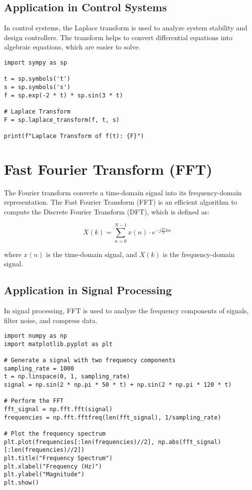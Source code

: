\documentclass{article}
\begin{document}
\subsection{Application in Control Systems}
In control systems, the Laplace transform is used to analyze system stability and design controllers. The transform helps to convert differential equations into algebraic equations, which are easier to solve.

\begin{lstlisting}[caption={laplace_transform.py -- Computing the Laplace Transform}, label=code:laplace_transform]
import sympy as sp

t = sp.symbols('t')
s = sp.symbols('s')
f = sp.exp(-2 * t) * sp.sin(3 * t)

# Laplace Transform
F = sp.laplace_transform(f, t, s)

print(f"Laplace Transform of f(t): {F}")
\end{lstlisting}

\section{Fast Fourier Transform (FFT)}
The Fourier transform converts a time-domain signal into its frequency-domain representation. The Fast Fourier Transform (FFT) is an efficient algorithm to compute the Discrete Fourier Transform (DFT), which is defined as:

\[
X(k) = \sum_{n=0}^{N-1} x(n) \cdot e^{-j \frac{2\pi}{N} kn}
\]

where \( x(n) \) is the time-domain signal, and \( X(k) \) is the frequency-domain signal.

\subsection{Application in Signal Processing}
In signal processing, FFT is used to analyze the frequency components of signals, filter noise, and compress data.

\begin{lstlisting}[caption={fft_signal_processing.py -- Fast Fourier Transform}, label=code:fft_signal_processing]
import numpy as np
import matplotlib.pyplot as plt

# Generate a signal with two frequency components
sampling_rate = 1000
t = np.linspace(0, 1, sampling_rate)
signal = np.sin(2 * np.pi * 50 * t) + np.sin(2 * np.pi * 120 * t)

# Perform the FFT
fft_signal = np.fft.fft(signal)
frequencies = np.fft.fftfreq(len(fft_signal), 1/sampling_rate)

# Plot the frequency spectrum
plt.plot(frequencies[:len(frequencies)//2], np.abs(fft_signal)[:len(frequencies)//2])
plt.title("Frequency Spectrum")
plt.xlabel("Frequency (Hz)")
plt.ylabel("Magnitude")
plt.show()
\end{lstlisting}
\end{document}
